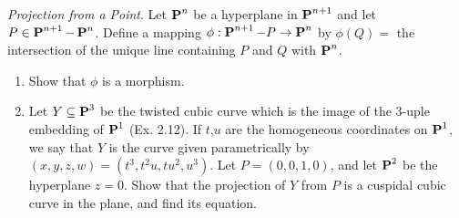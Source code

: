 \documentclass[10pt]{amsart}
\begin{document}
\begin{exercise}[3.14]
    \emph{Projection from a Point}. Let $\operatorname{\mathbf{P}}^n$ be a hyperplane in $\operatorname{\mathbf{P}}^{n+1}$ and let $P \in \operatorname{\mathbf{P}}^{n+1} - \operatorname{\mathbf{P}}^n$. 
    Define a mapping $\phi : \operatorname{\mathbf{P}}^{n+ 1} - P \to \operatorname{\mathbf{P}}^n$ by $\phi(Q) = $ the intersection of the unique line containing $P$ and $Q$ 
    with $\operatorname{\mathbf{P}}^n$.
    \begin{enumerate}[itemsep=1pt]
        \item Show that $\phi$ is a morphism.
        \item Let $Y \subseteq \operatorname{\mathbf{P}}^3$ be the twisted cubic curve which is the image of the 
        3-uple embedding of $\operatorname{\mathbf{P}}^1$ (Ex. 2.12). If $t$,$u$ are the homogeneous coordinates on $\operatorname{\mathbf{P}}^1$, 
        we say that $Y$ is the curve given parametrically by $(x,y,z,w) = (t^3,t^2u,tu^2,u^3)$. 
        Let $P = (0,0,1,0)$, and let $\operatorname{\mathbf{P}}^2$ be the hyperplane $z = 0$. Show that the projection of 
        $Y$ from $P$ is a cuspidal cubic curve in the plane, and find its equation.
    \end{enumerate}
\end{exercise}
\end{document}
